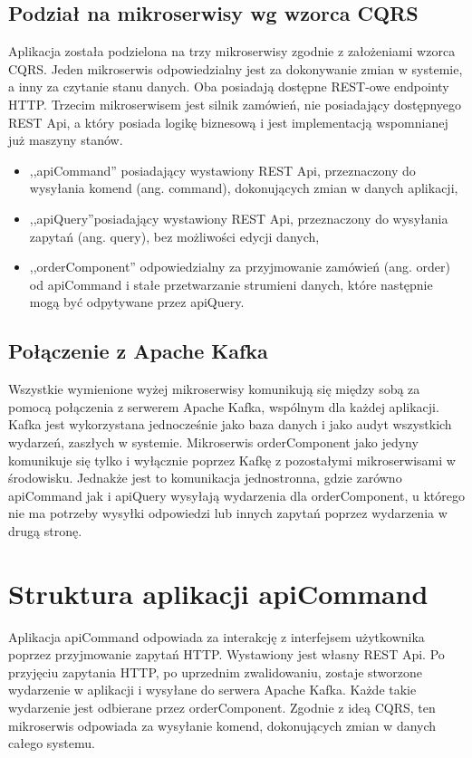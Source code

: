 \subsection{Podział na mikroserwisy wg wzorca CQRS}
Aplikacja została podzielona na trzy mikroserwisy zgodnie z założeniami wzorca CQRS. Jeden mikroserwis odpowiedzialny jest za dokonywanie zmian w systemie, a inny za czytanie stanu danych. Oba posiadają dostępne REST-owe endpointy HTTP. Trzecim mikroserwisem jest silnik zamówień, nie posiadający dostępnyego REST Api, a który posiada logikę biznesową i jest implementacją wspomnianej już maszyny stanów.

\begin{itemize}
    \item ,,apiCommand'' posiadający wystawiony REST Api, przeznaczony do wysyłania komend (ang. command), dokonujących zmian w danych aplikacji,
    \item ,,apiQuery''posiadający wystawiony REST Api, przeznaczony do wysyłania zapytań (ang. query), bez możliwości edycji danych,
    \item ,,orderComponent'' odpowiedzialny za przyjmowanie zamówień (ang. order) od apiCommand i stałe przetwarzanie strumieni danych, które następnie mogą być odpytywane przez apiQuery.
\end{itemize}


\subsection{Połączenie z Apache Kafka}
Wszystkie wymienione wyżej mikroserwisy komunikują się między sobą za pomocą połączenia z serwerem Apache Kafka, wspólnym dla każdej aplikacji. Kafka jest wykorzystana jednocześnie jako baza danych i jako audyt wszystkich wydarzeń, zaszłych w systemie. Mikroserwis orderComponent jako jedyny komunikuje się tylko i wyłącznie poprzez Kafkę z pozostałymi mikroserwisami w środowisku. Jednakże jest to komunikacja jednostronna, gdzie zarówno apiCommand jak i apiQuery wysyłają wydarzenia dla orderComponent, u którego nie ma potrzeby wysyłki odpowiedzi lub innych zapytań poprzez wydarzenia w drugą stronę.

\section{Struktura aplikacji apiCommand}
Aplikacja apiCommand odpowiada za interakcję z interfejsem użytkownika poprzez przyjmowanie zapytań HTTP. Wystawiony jest własny REST Api. Po przyjęciu zapytania HTTP, po uprzednim zwalidowaniu, zostaje stworzone wydarzenie w aplikacji i wysyłane do serwera Apache Kafka. Każde takie wydarzenie jest odbierane przez orderComponent. Zgodnie z ideą CQRS, ten mikroserwis odpowiada za wysyłanie komend, dokonujących zmian w danych całego systemu.

